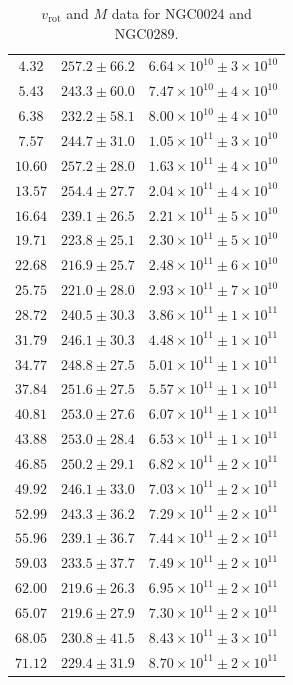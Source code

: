 \documentclass{article}
\newcommand\vrot{\ensuremath{v_{\textrm{rot}}}}
\begin{document}
\begin{table}[h!]
\begin{tabular}{|c|c|c|}
        $4.32$ & $257.2 \pm 66.2$ & $6.64\times 10^{10} \pm 3\times 10^{10}$ \\
        $5.43$ & $243.3 \pm 60.0$ & $7.47\times 10^{10} \pm 4\times 10^{10}$ \\
        $6.38$ & $232.2 \pm 58.1$ & $8.00\times 10^{10} \pm 4\times 10^{10}$ \\
        $7.57$ & $244.7 \pm 31.0$ & $1.05\times 10^{11} \pm 3\times 10^{10}$ \\
        $10.60$ & $257.2 \pm 28.0$ & $1.63\times 10^{11} \pm 4\times 10^{10}$ \\
        $13.57$ & $254.4 \pm 27.7$ & $2.04\times 10^{11} \pm 4\times 10^{10}$ \\
        $16.64$ & $239.1 \pm 26.5$ & $2.21\times 10^{11} \pm 5\times 10^{10}$ \\
        $19.71$ & $223.8 \pm 25.1$ & $2.30\times 10^{11} \pm 5\times 10^{10}$ \\
        $22.68$ & $216.9 \pm 25.7$ & $2.48\times 10^{11} \pm 6\times 10^{10}$ \\
        $25.75$ & $221.0 \pm 28.0$ & $2.93\times 10^{11} \pm 7\times 10^{10}$ \\
        $28.72$ & $240.5 \pm 30.3$ & $3.86\times 10^{11} \pm 1\times 10^{11}$ \\
        $31.79$ & $246.1 \pm 30.3$ & $4.48\times 10^{11} \pm 1\times 10^{11}$ \\
        $34.77$ & $248.8 \pm 27.5$ & $5.01\times 10^{11} \pm 1\times 10^{11}$ \\
        $37.84$ & $251.6 \pm 27.5$ & $5.57\times 10^{11} \pm 1\times 10^{11}$ \\
        $40.81$ & $253.0 \pm 27.6$ & $6.07\times 10^{11} \pm 1\times 10^{11}$ \\
        $43.88$ & $253.0 \pm 28.4$ & $6.53\times 10^{11} \pm 1\times 10^{11}$ \\
        $46.85$ & $250.2 \pm 29.1$ & $6.82\times 10^{11} \pm 2\times 10^{11}$ \\
        $49.92$ & $246.1 \pm 33.0$ & $7.03\times 10^{11} \pm 2\times 10^{11}$ \\
        $52.99$ & $243.3 \pm 36.2$ & $7.29\times 10^{11} \pm 2\times 10^{11}$ \\
        $55.96$ & $239.1 \pm 36.7$ & $7.44\times 10^{11} \pm 2\times 10^{11}$ \\
        $59.03$ & $233.5 \pm 37.7$ & $7.49\times 10^{11} \pm 2\times 10^{11}$ \\
        $62.00$ & $219.6 \pm 26.3$ & $6.95\times 10^{11} \pm 2\times 10^{11}$ \\
        $65.07$ & $219.6 \pm 27.9$ & $7.30\times 10^{11} \pm 2\times 10^{11}$ \\
        $68.05$ & $230.8 \pm 41.5$ & $8.43\times 10^{11} \pm 3\times 10^{11}$ \\
        $71.12$ & $229.4 \pm 31.9$ & $8.70\times 10^{11} \pm 2\times 10^{11}$ \\
        \hline
    \end{tabular}
    \caption{$\vrot$ and $M$ data for NGC0024 and NGC0289.}
    \label{tab:proc0024,0289}
\end{table}
\end{document}
